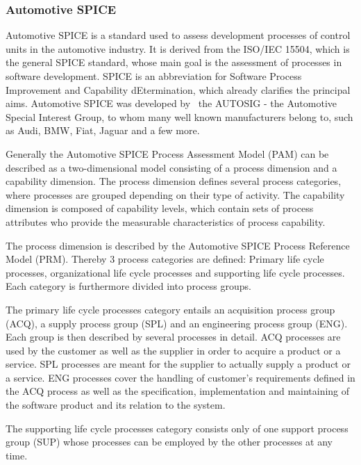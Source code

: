 \hypertarget{h.98eiyanf314e}{\subsubsection{\texorpdfstring{{Automotive
SPICE }}{Automotive SPICE }}\label{h.98eiyanf314e}}

{Automotive SPICE is a standard used to assess development processes of
control units in the automotive industry. It is derived from the ISO/IEC
15504, which is the general SPICE standard, whose main goal is the
assessment of processes in software development. SPICE is an
abbreviation for }{S}{oftware }{P}{rocess }{I}{mprovement and
}{C}{apability d}{E}{termination, which already clarifies the principal
aims. Automotive SPICE was developed by ~the AUTOSIG - the
}{Auto}{motive }{S}{pecial }{I}{nterest }{G}{roup, to whom many well
known manufacturers belong to, such as Audi, BMW, Fiat, Jaguar and a few
more.}

{Generally the Automotive SPICE Process Assessment Model (PAM) can be
described as a two-dimensional model consisting of a process dimension
and a capability dimension. The process dimension defines several
process categories, where processes are grouped depending on their type
of activity. The capability dimension is composed of capability levels,
which contain sets of process attributes who provide the measurable
characteristics of process capability.}

{The process dimension is described by the Automotive SPICE Process
Reference Model (PRM). Thereby 3 process categories are defined: Primary
life cycle processes, organizational life cycle processes and supporting
life cycle processes. Each category is furthermore divided into process
groups.}

{The primary life cycle processes category entails an acquisition
process group (ACQ), a supply process group (SPL) and an engineering
process group (ENG). Each group is then described by several processes
in detail. ACQ processes are used by the customer as well as the
supplier in order to acquire a product or a service. SPL processes are
meant for the supplier to actually supply a product or a service. ENG
processes cover the handling of customer's requirements defined in the
ACQ process as well as the specification, implementation and maintaining
of the software product and its relation to the system.}

{The supporting life cycle processes category consists only of one
support process group (SUP) whose processes can be employed by the other
processes at any time.}


